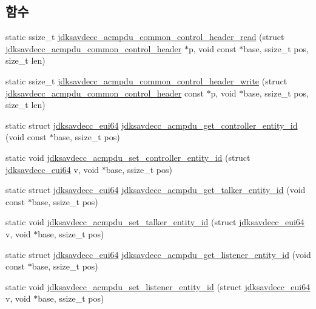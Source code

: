 \subsection*{함수}
\begin{DoxyCompactItemize}
\item 
static ssize\+\_\+t \hyperlink{group__acmpdu_gaa999105ba3743fa5a7ff66fd2cf7574f}{jdksavdecc\+\_\+acmpdu\+\_\+common\+\_\+control\+\_\+header\+\_\+read} (struct \hyperlink{structjdksavdecc__acmpdu__common__control__header}{jdksavdecc\+\_\+acmpdu\+\_\+common\+\_\+control\+\_\+header} $\ast$p, void const $\ast$base, ssize\+\_\+t pos, size\+\_\+t len)
\item 
static ssize\+\_\+t \hyperlink{group__acmpdu_gac16d3a1b77049d801599ad8887570a42}{jdksavdecc\+\_\+acmpdu\+\_\+common\+\_\+control\+\_\+header\+\_\+write} (struct \hyperlink{structjdksavdecc__acmpdu__common__control__header}{jdksavdecc\+\_\+acmpdu\+\_\+common\+\_\+control\+\_\+header} const $\ast$p, void $\ast$base, ssize\+\_\+t pos, size\+\_\+t len)
\item 
static struct \hyperlink{structjdksavdecc__eui64}{jdksavdecc\+\_\+eui64} \hyperlink{group__acmpdu_ga4734ff28226ad92c7382a332e675d24e}{jdksavdecc\+\_\+acmpdu\+\_\+get\+\_\+controller\+\_\+entity\+\_\+id} (void const $\ast$base, ssize\+\_\+t pos)
\item 
static void \hyperlink{group__acmpdu_ga8ba74460ac2b650db7f863a1c52e783a}{jdksavdecc\+\_\+acmpdu\+\_\+set\+\_\+controller\+\_\+entity\+\_\+id} (struct \hyperlink{structjdksavdecc__eui64}{jdksavdecc\+\_\+eui64} v, void $\ast$base, ssize\+\_\+t pos)
\item 
static struct \hyperlink{structjdksavdecc__eui64}{jdksavdecc\+\_\+eui64} \hyperlink{group__acmpdu_ga9efe0b94b146760a8849d872d2a00da7}{jdksavdecc\+\_\+acmpdu\+\_\+get\+\_\+talker\+\_\+entity\+\_\+id} (void const $\ast$base, ssize\+\_\+t pos)
\item 
static void \hyperlink{group__acmpdu_ga1215a04ac21acaa6addba866809c4a81}{jdksavdecc\+\_\+acmpdu\+\_\+set\+\_\+talker\+\_\+entity\+\_\+id} (struct \hyperlink{structjdksavdecc__eui64}{jdksavdecc\+\_\+eui64} v, void $\ast$base, ssize\+\_\+t pos)
\item 
static struct \hyperlink{structjdksavdecc__eui64}{jdksavdecc\+\_\+eui64} \hyperlink{group__acmpdu_ga138eb586d71333fa5c27c226373c771f}{jdksavdecc\+\_\+acmpdu\+\_\+get\+\_\+listener\+\_\+entity\+\_\+id} (void const $\ast$base, ssize\+\_\+t pos)
\item 
static void \hyperlink{group__acmpdu_ga347e04611d57db599d1204f56b09d89c}{jdksavdecc\+\_\+acmpdu\+\_\+set\+\_\+listener\+\_\+entity\+\_\+id} (struct \hyperlink{structjdksavdecc__eui64}{jdksavdecc\+\_\+eui64} v, void $\ast$base, ssize\+\_\+t pos)

\end{DoxyCompactItemize}
